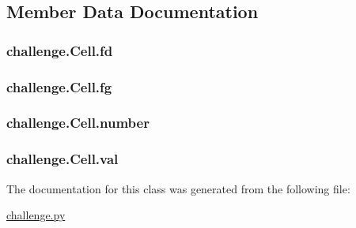 \subsection{Member Data Documentation}
\hypertarget{classchallenge_1_1Cell_a8af23c22ab09130f1e03cec24777c432}{
\subsubsection[{fd}]{\setlength{\rightskip}{0pt plus 5cm}challenge.\+Cell.\+fd}}\label{classchallenge_1_1Cell_a8af23c22ab09130f1e03cec24777c432}
\hypertarget{classchallenge_1_1Cell_a5f17b6f09c07a021be81c1086b1f1381}{
\subsubsection[{fg}]{\setlength{\rightskip}{0pt plus 5cm}challenge.\+Cell.\+fg}}\label{classchallenge_1_1Cell_a5f17b6f09c07a021be81c1086b1f1381}
\hypertarget{classchallenge_1_1Cell_acfc8638f77a950b74a9ec6ece4c9a648}{
\subsubsection[{number}]{\setlength{\rightskip}{0pt plus 5cm}challenge.\+Cell.\+number}}\label{classchallenge_1_1Cell_acfc8638f77a950b74a9ec6ece4c9a648}
\hypertarget{classchallenge_1_1Cell_a96bb4472b836d22b6090eb3e4a41a977}{
\subsubsection[{val}]{\setlength{\rightskip}{0pt plus 5cm}challenge.\+Cell.\+val}}\label{classchallenge_1_1Cell_a96bb4472b836d22b6090eb3e4a41a977}


The documentation for this class was generated from the following file\+:\begin{DoxyCompactItemize}
\item 
\hyperlink{challenge_8py}{challenge.\+py}\end{DoxyCompactItemize}

